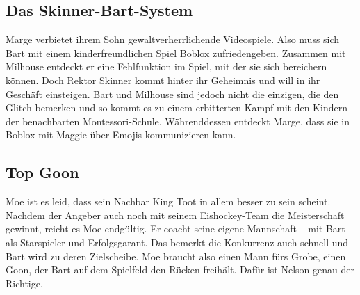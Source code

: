 
\subsection{Das Skinner-Bart-System}
Marge verbietet ihrem Sohn gewaltverherrlichende Videospiele. Also muss sich Bart mit einem kinderfreundlichen Spiel Boblox zufriedengeben. Zusammen mit Milhouse entdeckt er eine Fehlfunktion im Spiel, mit der sie sich bereichern können. Doch Rektor Skinner kommt hinter ihr Geheimnis und will in ihr Geschäft einsteigen. Bart und Milhouse sind jedoch nicht die einzigen, die den Glitch bemerken und so kommt es zu einem erbitterten Kampf mit den Kindern der benachbarten Montessori-Schule. Währenddessen entdeckt Marge, dass sie in Boblox mit Maggie über Emojis kommunizieren kann.


\subsection{Top Goon}
Moe ist es leid, dass sein Nachbar King Toot in allem besser zu sein scheint. Nachdem der Angeber auch noch mit seinem Eishockey-Team die Meisterschaft gewinnt, reicht es Moe endgültig. Er coacht seine eigene Mannschaft -- mit Bart als Starspieler und Erfolgsgarant. Das bemerkt die Konkurrenz auch schnell und Bart wird zu deren Zielscheibe. Moe braucht also einen Mann fürs Grobe, einen \glqq Goon\grqq, der Bart auf dem Spielfeld den Rücken freihält. Dafür ist Nelson genau der Richtige.


